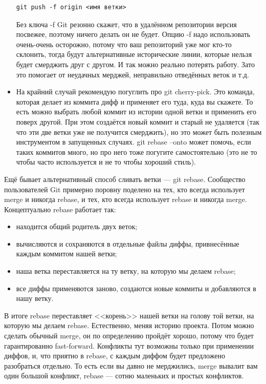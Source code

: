 \documentclass{../../text-style}
\begin{document}
\begin{itemize}
\begin{verbatim}
git push -f origin <имя ветки>
        \end{verbatim}
        Без ключа -f Git резонно скажет, что в удалённом репозитории версия посвежее, поэтому ничего делать он не будет. Опцию -f надо использовать очень-очень осторожно, потому что ваш репозиторий уже мог кто-то склонить, тогда будут альтернативные исторические линии, которые нельзя будет смерджить друг с другом. И так можно реально потерять работу. Зато это помогает от неудачных мерджей, неправильно отведённых веток и т.д.
    \item На крайний случай рекомендую погуглить про git cherry-pick. Это команда, которая делает из коммита дифф и применяет его туда, куда вы скажете. То есть можно выбрать любой коммит из истории одной ветки и применить его поверх другой. При этом создаётся новый коммит и старый не удаляется (так что эти две ветки уже не получится смерджить), но это может быть полезным инструментом в запущенных случаях. git rebase --onto может помочь, если таких коммитов много, но про него тоже погугите самостоятельно (это не то чтобы часто используется и не то чтобы хороший стиль).
\end{itemize}

Ещё бывает альтернативный способ сливать ветки --- git rebase. Сообщество пользователей Git примерно поровну поделено на тех, кто всегда использует merge и никогда rebase, и тех, кто всегда использует rebase и никогда merge. Концептуально rebase работает так:

\begin{itemize}
	\item находится общий родитель двух веток;
	\item вычисляются и сохраняются в отдельные файлы диффы, привнесённые каждым коммитом нашей ветки;
	\item наша ветка переставляется на ту ветку, на которую мы делаем rebase;
	\item все диффы применяются заново, создаются новые коммиты и добавляются в нашу ветку.
\end{itemize}

В итоге rebase переставляет <<корень>> нашей ветки на голову той ветки, на которую мы делаем rebase. Естественно, меняя историю проекта. Потом можно сделать обычный merge, он по определению пройдёт хорошо, потому что будет гарантированно fast-forward. Конфликты тут возможны только при применении диффов, и, что приятно в rebase, с каждым диффом будет предложено разобраться отдельно. То есть если вы давно не мерджились, merge вывалит вам один большой конфликт, rebase --- сотню маленьких и простых конфликтов.
\end{document}
